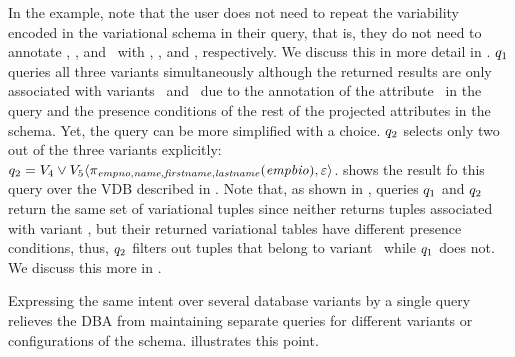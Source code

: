 

In the example, note that the user does not need to repeat the variability  encoded
in the variational schema in their query, that is, they do not need to annotate \name,
\fname, and \lname\ with \vFour, \vFive, and \vFive, respectively. We discuss
this in more detail in . $\vQ_1$
queries all three variants simultaneously although the returned results are
only associated with variants \vFour\ and \vFive\ due to the annotation of the
attribute \empno\ in the query and the presence conditions of the rest of the
projected attributes in the schema.
%
Yet, the query can be more simplified with a choice. $\vQ_2$ selects only two
out of the three variants explicitly:
$\vQ_2=\chc[\vFour\vee\vFive]{\pi_{\empno,\name,\fname,\lname}(\empbio),\empRel}$. 
%
 shows the result fo this query over the VDB described in .
%
Note that, as shown in , 
queries $\vQ_1$ and $\vQ_2$ return the same set of variational tuples since
neither returns tuples associated with variant \vThree, but their returned
variational tables have different presence conditions, thus, $\vQ_2$ filters out
tuples that belong to variant \vThree\ while $\vQ_1$ does not. We discuss this
more in . 
%


 Expressing
the same intent over several database variants by a single query relieves the DBA from
maintaining separate queries for different variants or configurations of the
schema.
illustrates this point.

